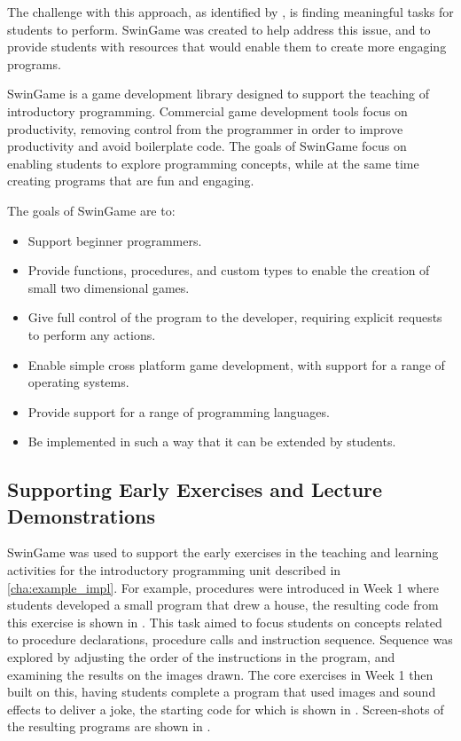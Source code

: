 The challenge with this approach, as identified by \citet{Pattis:1993}, is finding meaningful tasks for students to perform. SwinGame was created to help address this issue, and to provide students with resources that would enable them to create more engaging programs.

SwinGame is a game development library designed to support the teaching of introductory programming. Commercial game development tools focus on productivity, removing control from the programmer in order to improve productivity and avoid boilerplate code. The goals of SwinGame focus on enabling students to explore programming concepts, while at the same time creating programs that are fun and engaging. 

The goals of SwinGame are to:
\begin{itemize}[noitemsep, nolistsep]
   \item Support beginner programmers.
   \item Provide functions, procedures, and custom types to enable the creation of small two dimensional games.
   \item Give full control of the program to the developer, requiring explicit requests to perform any actions.
   \item Enable simple cross platform game development, with support for a range of operating systems.
   \item Provide support for a range of programming languages.
   \item Be implemented in such a way that it can be extended by students.
\end{itemize} 


\subsection{Supporting Early Exercises and Lecture Demonstrations} %
\label{sub:supporting_early_exercises}

SwinGame was used to support the early exercises in the teaching and learning activities for the introductory programming unit described in \cref{cha:example_impl}. For example, procedures were introduced in Week 1 where students developed a small program that drew a house, the resulting code from this exercise is shown in . This task aimed to focus students on concepts related to procedure declarations, procedure calls and instruction sequence. Sequence was explored by adjusting the order of the instructions in the program, and examining the results on the images drawn. The core exercises in Week 1 then built on this, having students complete a program that used images and sound effects to deliver a joke, the starting code for which is shown in . Screen-shots of the resulting programs are shown in .

